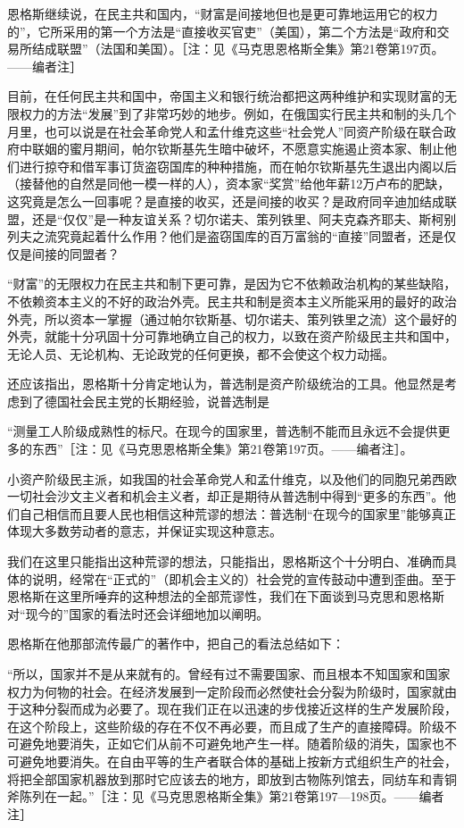 \documentclass[UTF8, 12pt, a4paper]{ctexrep}
\begin{document}
恩格斯继续说，在民主共和国内，“财富是间接地但也是更可靠地运用它的权力的”，它所采用的第一个方法是“直接收买官吏”（美国），第二个方法是“政府和交易所结成联盟”（法国和美国）。［注：见《马克思恩格斯全集》第21卷第197页。——编者注］

目前，在任何民主共和国中，帝国主义和银行统治都把这两种维护和实现财富的无限权力的方法“发展”到了非常巧妙的地步。例如，在俄国实行民主共和制的头几个月里，也可以说是在社会革命党人和孟什维克这些“社会党人”同资产阶级在联合政府中联姻的蜜月期间，帕尔钦斯基先生暗中破坏，不愿意实施遏止资本家、制止他们进行掠夺和借军事订货盗窃国库的种种措施，而在帕尔钦斯基先生退出内阁以后（接替他的自然是同他一模一样的人），资本家“奖赏”给他年薪12万卢布的肥缺，这究竟是怎么一回事呢？是直接的收买，还是间接的收买？是政府同辛迪加结成联盟，还是“仅仅”是一种友谊关系？切尔诺夫、策列铁里、阿夫克森齐耶夫、斯柯别列夫之流究竟起着什么作用？他们是盗窃国库的百万富翁的“直接”同盟者，还是仅仅是间接的同盟者？

“财富”的无限权力在民主共和制下更可靠，是因为它不依赖政治机构的某些缺陷，不依赖资本主义的不好的政治外壳。民主共和制是资本主义所能采用的最好的政治外壳，所以资本一掌握（通过帕尔钦斯基、切尔诺夫、策列铁里之流）这个最好的外壳，就能十分巩固十分可靠地确立自己的权力，以致在资产阶级民主共和国中，无论人员、无论机构、无论政党的任何更换，都不会使这个权力动摇。

还应该指出，恩格斯十分肯定地认为，普选制是资产阶级统治的工具。他显然是考虑到了德国社会民主党的长期经验，说普选制是

“测量工人阶级成熟性的标尺。在现今的国家里，普选制不能而且永远不会提供更多的东西”［注：见《马克思恩格斯全集》第21卷第197页。——编者注］。

小资产阶级民主派，如我国的社会革命党人和孟什维克，以及他们的同胞兄弟西欧一切社会沙文主义者和机会主义者，却正是期待从普选制中得到“更多的东西”。他们自己相信而且要人民也相信这种荒谬的想法：普选制“在现今的国家里”能够真正体现大多数劳动者的意志，并保证实现这种意志。

我们在这里只能指出这种荒谬的想法，只能指出，恩格斯这个十分明白、准确而具体的说明，经常在“正式的”（即机会主义的）社会党的宣传鼓动中遭到歪曲。至于恩格斯在这里所唾弃的这种想法的全部荒谬性，我们在下面谈到马克思和恩格斯对“现今的”国家的看法时还会详细地加以阐明。

恩格斯在他那部流传最广的著作中，把自己的看法总结如下：

“所以，国家并不是从来就有的。曾经有过不需要国家、而且根本不知国家和国家权力为何物的社会。在经济发展到一定阶段而必然使社会分裂为阶级时，国家就由于这种分裂而成为必要了。现在我们正在以迅速的步伐接近这样的生产发展阶段，在这个阶段上，这些阶级的存在不仅不再必要，而且成了生产的直接障碍。阶级不可避免地要消失，正如它们从前不可避免地产生一样。随着阶级的消失，国家也不可避免地要消失。在自由平等的生产者联合体的基础上按新方式组织生产的社会，将把全部国家机器放到那时它应该去的地方，即放到古物陈列馆去，同纺车和青铜斧陈列在一起。”［注：见《马克思恩格斯全集》第21卷第197—198页。——编者注］
\end{document}
